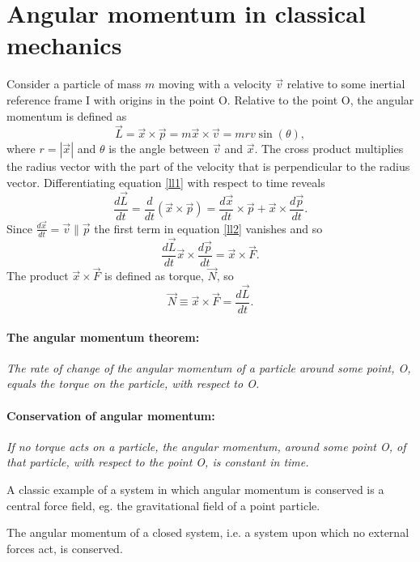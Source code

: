 \section{Angular momentum in classical mechanics}
Consider a particle of mass $m$ moving with a velocity $\vec{v}$ relative to some inertial reference frame I with origins in the point O. Relative to the point O, the angular momentum is defined as
\begin{equation}
	\vec{L}=\vec{x}\times \vec{p}=m\vec{x}\times \vec{v}=m rv\sin(\theta),
	\label{ll1}
\end{equation} 
where $r=|\vec{x}|$ and $\theta$ is the angle between $\vec{v}$ and $\vec{x}$. The cross product multiplies the radius vector with the part of the velocity that is perpendicular to the radius vector. Differentiating equation \eqref{ll1} with respect to time reveals
\begin{equation}
	\frac{d\vec{L}}{dt}=\frac{d}{dt}(\vec{x}\times \vec{p})=\frac{d\vec{x}}{dt}\times \vec{p}+\vec{x}\times \frac{d\vec{p}}{dt}.
	\label{ll2}
\end{equation} 
Since $\frac{d\vec{x}}{dt}=\vec{v}\parallel \vec{p}$ the first term in equation \eqref{ll2} vanishes and so
\begin{equation}
	\frac{d\vec{L}}{dt}\vec{x}\times \frac{d\vec{p}}{dt}=\vec{x}\times\vec{F}.
\end{equation} 
The product $\vec{x}\times\vec{F}$ is defined as torque, $\vec{N}$, so
\begin{equation}
	\vec{N}\equiv \vec{x}\times\vec{F}=\frac{d\vec{L}}{dt}.
	\label{ll3}
\end{equation}  
\paragraph{The angular momentum theorem:} \emph{The rate of change of the angular momentum of a particle around some point, O, equals the torque on the particle, with respect to O.}

\paragraph{Conservation of angular momentum:} \emph{If no torque acts on a particle, the angular momentum, around some point O, of that particle, with respect to the point O, is constant in time.}

\begin{example}
	A classic example of a system in which angular momentum is conserved is a central force field, eg. the gravitational field of a point particle. 
\end{example}
\begin{example}
	The angular momentum of a closed system, i.e. a system upon which no external forces act, is conserved. 
\end{example}

